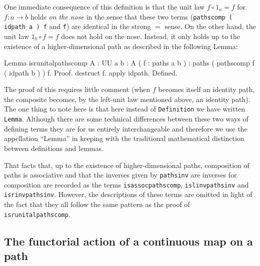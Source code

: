 One immediate consequence of this definition is that the unit law
$f\circ 1_{a}=f$ for $f:a\to b$ holds \emph{on the nose} in the sense
that these two terms (\verb|pathscomp ( idpath a ) f| and 
\verb|f|) are identical in the strong $=$ sense.  On the other
hand, the unit law $1_{b}\circ f=f$ does not hold on the nose.
Instead, it only holds up to the existence of a higher-dimensional
path as described in the following Lemma:
\begin{center}
  \begin{coqcode}
Lemma isrunitalpathscomp { A : UU } { a b : A } ( f : paths a b ) : paths ( pathscomp f ( idpath b ) ) f.
Proof.
  destruct f. apply idpath. 
Defined.
  \end{coqcode}
\end{center}
The proof of this requires little comment (when $f$ becomes itself an
identity path, the composite becomes, by the left-unit law mentioned
above, an identity path).  The one thing to note here is that here
instead of \verb|Definition| we have written \verb|Lemma|.
Although there are some technical differences between these two ways
of defining terms they are for us entirely interchangeable and
therefore we use the appellation ``Lemma'' in keeping with the
traditional mathematical distinction between definitions and lemmas.

That facts that, up to the existence of higher-dimensional paths,
composition of paths is associative and that the inverses given
by \verb|pathsinv| are inverses for composition are recorded as
the terms \verb|isassocpathscomp|, \verb|islinvpathsinv| and
\verb|isrinvpathsinv|.  However, the descriptions of
these terms are omitted in light of the fact that they all
follow the same pattern as the proof of \verb|isrunitalpathscomp|.

\subsection{The functorial action of a continuous map on a path}

